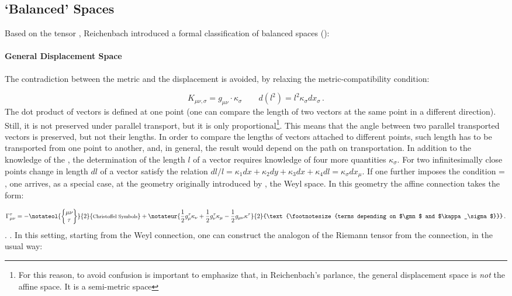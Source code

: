 \documentclass[submitted]{article}
\newcommand{\texts}[1]{\text{\footnotesize{#1}}}
\begin{document}
\subsection{`Balanced' Spaces}

Based on the tensor \nonmetr, Reichenbach introduced a formal classification of balanced spaces ():

\paragraph{General Displacement Space} The contradiction between the metric and the displacement is avoided, by relaxing the metric-compatibility condition: 

\begin{equation*}
K_{\mu \nu, \sigma}=g_{\mu \nu} \cdot \kappa_{\sigma} \quad \quad d\left({l}^{2}\right)={l}^{2} \kappa_\sigma dx_\sigma\,.
\end{equation*}
%
The dot product of vectors is defined at one point (one can compare the length of two vectors at the same point in a different direction). Still, it is not preserved under parallel transport, but it is only proportional\footnote{For this reason, to avoid confusion is important to emphasize that, in Reichenbach's parlance, the general displacement space is \emph{not} the affine space. It is a semi-metric space}. This means that the angle between two parallel transported vectors is preserved, but not their lengths. In order to compare the lengths of vectors attached to different points, such length has to be transported from one point to another, and, in general, the result would depend on the path on transportation. In addition to the knowledge of the \gmn, the determination of the length $l$ of a vector requires knowledge of four more quantities $\kappa_\sigma$. For two infinitesimally close points change in length $dl$ of a vector satisfy the relation $dl/l =\kappa_{1} d x+\kappa_{2} d y+\kappa_{3} d x+\kappa_{4} d l=\kappa_{\sigma} d x_{\mu}$. If one further imposes the condition \Gtmn = \Gtmn, one arrives, as a special case, at the geometry originally introduced by \citet{Weyl1918a}, the Weyl space. In this geometry the affine connection takes the form:

\begin{equation}\label{eq:weylconnection}
\Gtmn=-\notateol{\christoffel{\mu}{\nu}{\tau}}{2}{\texts{Christoffel Symbols}}+\notateur{\frac{1}{2} g_{\mu}^{\tau} \kappa_{\nu}+\frac{1}{2} g_{\nu}^{\tau} \kappa_{\mu}-\frac{1}{2} \gmn \kappa^{\tau}}{2}{\texts{terms depending on $\gmn$ and $\kappa_\sigma$}} \,.
\end{equation}
%
. . In this setting, starting from the Weyl connection, one can construct the analogon of the Riemann tensor from the connection, in the usual way:
 
\end{document}
